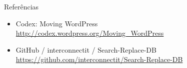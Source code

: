 \documentclass[handout]{beamer}
\begin{document}
\begin{frame}{Referências}
\begin{itemize}
  \footnotesize
  \item Codex: Moving WordPress \\
        \url{http://codex.wordpress.org/Moving_WordPress}
  \item GitHub / interconnectit / Search-Replace-DB \\
        \url{https://github.com/interconnectit/Search-Replace-DB}
\end{itemize}
\end{frame}
\end{document}
